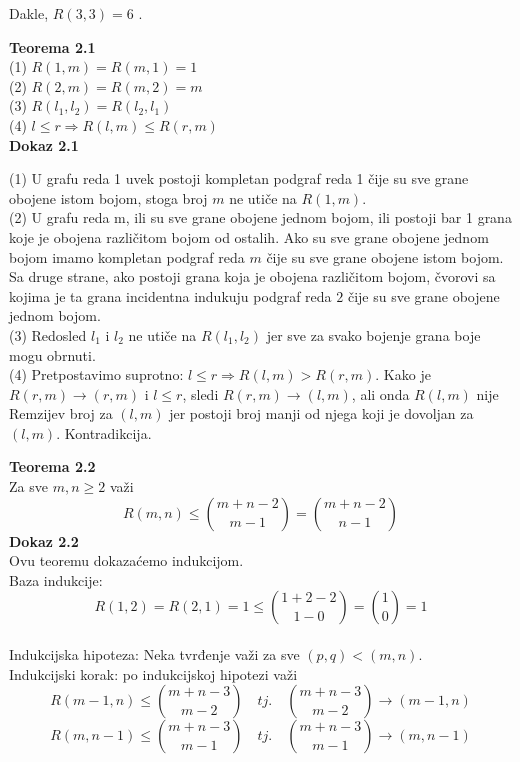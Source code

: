 \documentclass[12pt,a4paper]{article}
\begin{document}
	Dakle, $R(3,3)=6$ .	
	
	\newpage
	
	{\noindent\fontsize{12pt}{12pt}\textbf{Teorema 2.1}}
	\vspace{0.5em}	
	\\
	(1) {} {} $R(1, m) = R(m, 1) = 1$\\
	(2) {} {} $R(2, m) = R(m, 2) = m$\\
	(3) {} {} $R(l_{1}, l_{2}) = R(l_{2}, l_{1})$\\
	(4) {} {} $l \leq r \Rightarrow R(l, m) \leq R(r, m)$\\
	
	{\noindent\fontsize{12pt}{12pt}\textbf{Dokaz 2.1}}
	
	\vspace{0.5em}
	
	\noindent(1) {} {} U grafu reda 1 uvek postoji kompletan podgraf reda 1 čije su sve grane obojene istom bojom, stoga broj $m$ ne utiče na $R(1, m)$.
	\vspace{0.5em} 	\\
	\noindent(2) {} {} U grafu reda m, ili su sve grane obojene jednom bojom, ili postoji bar 1 grana koje je obojena različitom bojom od ostalih. Ako su sve grane obojene jednom bojom imamo kompletan podgraf reda $m$ čije su sve grane obojene istom bojom. Sa druge strane, ako postoji grana koja je obojena različitom bojom, čvorovi sa kojima je ta grana incidentna indukuju podgraf reda $2$ čije su sve grane obojene jednom bojom.
	\vspace{0.5em} \\
	\noindent(3) {} {} Redosled $l_{1}$ i $l_{2}$ ne utiče na $R(l_{1}, l_{2})$ jer sve za svako bojenje grana boje mogu obrnuti.
	\vspace{0.5em} \\
	\noindent(4) {} {} Pretpostavimo suprotno: $l \leq r \Rightarrow R(l, m) > R(r, m)$. Kako je $R(r, m) \rightarrow (r,m)$ i  $l \leq r$, sledi $R(r, m) \rightarrow (l, m)$, ali onda $R(l, m)$ nije Remzijev broj za $(l,m)$ jer postoji broj manji od njega koji je dovoljan za $(l, m)$. Kontradikcija.
	\vspace{1.5em}
	
	{\noindent\fontsize{12pt}{12pt}\textbf{Teorema 2.2}}
	\vspace{0.5em}	
	\\
	Za sve $m,n \geq 2$ važi
	\[R(m,n) \leq {m+n-2\choose m-1} = {m+n-2\choose n-1}\]
	\vspace{1em}
	{\noindent\fontsize{12pt}{12pt}\textbf{Dokaz 2.2}}	\vspace{-0.5em}
	\\
	\noindent Ovu teoremu dokazaćemo indukcijom.\\
	Baza indukcije:\\
	\[R(1,2) = R(2,1) = 1 \leq {1+2-2\choose 1-0}={1\choose 0}=1\]\\
	Indukcijska hipoteza:
	Neka tvrđenje važi za sve $(p,q)<(m,n)$.\\
	Indukcijski korak: po indukcijskoj hipotezi važi 
	\[R(m-1, n) \leq {m+n-3\choose m-2} \quad tj. \quad {m+n-3\choose m-2}\rightarrow (m-1, n)\] 
	\[R(m, n-1) \leq {m+n-3\choose m-1} \quad tj. \quad {m+n-3\choose m-1}\rightarrow (m, n-1)\]
	
\end{document}
